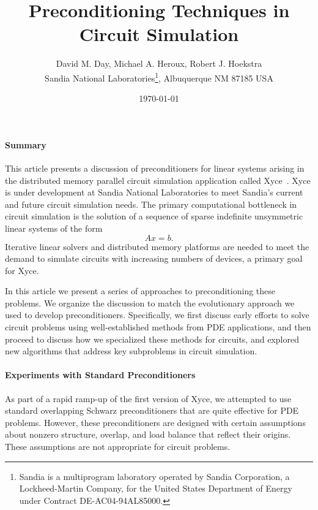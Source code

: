 \documentclass[10pt,fleqn]{article}
\begin{document}
%
%
\title{Preconditioning Techniques in Circuit Simulation}

\author{David M. Day, Michael A. Heroux, Robert J. Hoekstra \\
Sandia National Laboratories\footnote{
Sandia is a multiprogram laboratory operated by Sandia Corporation, a
Lockheed-Martin Company, for the United States Department of Energy
under Contract DE-AC04-94AL85000.}, Albuquerque NM 87185 USA}

\date{\today}

\maketitle

\paragraph{Summary}
This article presents a discussion of
preconditioners for linear systems arising in the 
distributed memory parallel circuit simulation application called
Xyce~\cite{Xyce}. Xyce is under development at Sandia National Laboratories to
meet Sandia's current and future circuit simulation needs.
The primary computational bottleneck in circuit simulation is the
solution of a sequence of sparse indefinite unsymmetric linear systems
of the form 
\begin{equation}
Ax = b.
\label{Equation1}
\end{equation}
Iterative linear solvers and distributed memory platforms
are needed to meet the demand to simulate circuits with increasing
numbers of devices, a primary goal for Xyce.  

In this article we present a series of approaches to
preconditioning these problems.  We organize the discussion to match
the evolutionary approach we used to develop preconditioners.
Specifically, we first discuss early efforts to solve circuit problems
using well-established methods from PDE applications, and then proceed
to discuss how we specialized these methods for circuits, and explored
new algorithms that address key subproblems in circuit simulation.


\paragraph{Experiments with Standard Preconditioners}
As part of a rapid ramp-up of the first version of Xyce, 
we attempted to use standard overlapping Schwarz preconditioners that are quite effective
for PDE problems.  However, these preconditioners are designed with certain
assumptions about nonzero structure,
overlap, and load balance that reflect their origins.  These assumptions are not appropriate
for circuit problems.
\end{document}
